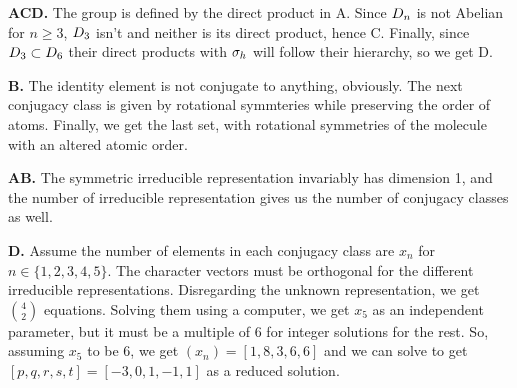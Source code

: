 \begin{alphaparts}
    \questionpart
    \textbf{ACD.} The group is defined by the direct product in A.
    Since $D_n$ is not Abelian for $n \geq 3$, $D_3$ isn't
    and neither is its direct product, hence C. Finally, since $D_3 \subset D_6$
    their direct products with $\sigma_h$ will follow their hierarchy, so we get D.

    \questionpart
    \textbf{B.} The identity element is not conjugate to anything, obviously. The next conjugacy
    class is given by rotational symmteries while preserving the order of atoms. Finally, we get 
    the last set, with rotational symmetries of the molecule with an altered atomic order.

    \questionpart
    \textbf{AB.} The symmetric irreducible representation invariably has dimension 1, and the number
    of irreducible representation gives us the number of conjugacy classes as well.

    \questionpart
    \textbf{D.} Assume the number of elements in each conjugacy class are $x_n$ for $n \in \{1, 2, 3, 4, 5\}$.
    The character vectors must be orthogonal for the different irreducible representations.
    Disregarding the unknown representation, we get $\binom{4}{2}$ equations. Solving them 
    using a computer, we get $x_5$ as an independent parameter, but it must be a multiple of 6 for
    integer solutions for the rest. So, assuming $x_5$ to be 6, we get $(x_n) = [1, 8, 3, 6, 6]$ and
    we can solve to get $[p, q, r, s, t] = [-3, 0, 1, -1, 1]$ as a reduced solution.

\end{alphaparts}